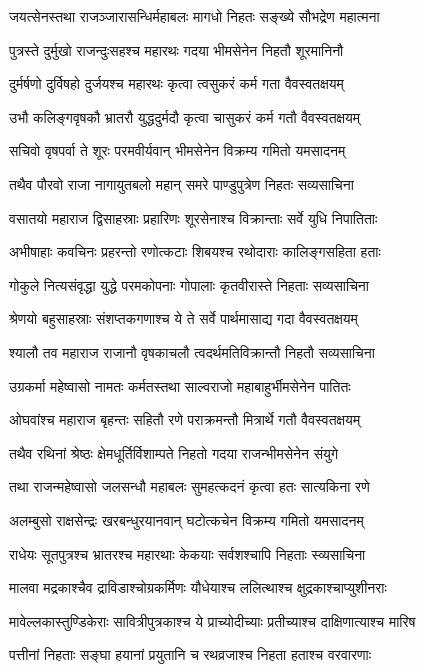 \twolineshloka
{जयत्सेनस्तथा राजञ्जारासन्धिर्महाबलः}
{मागधो निहतः सङ्ख्ये सौभद्रेण महात्मना}


\twolineshloka
{पुत्रस्ते दुर्मुखो राजन्दुःसहश्च महारथः}
{गदया भीमसेनेन निहतौ शूरमानिनौ}


\twolineshloka
{दुर्मर्षणो दुर्विषहो दुर्जयश्च महारथः}
{कृत्वा त्वसुकरं कर्म गता वैवस्वतक्षयम्}


\twolineshloka
{उभौ कलिङ्गवृषकौ भ्रातरौ युद्धदुर्मदौ}
{कृत्वा चासुकरं कर्म गतौ वैवस्वतक्षयम्}


\twolineshloka
{सचिवो वृषपर्वा ते शूरः परमवीर्यवान्}
{भीमसेनेन विक्रम्य गमितो यमसादनम्}


\twolineshloka
{तथैव पौरवो राजा नागायुतबलो महान्}
{समरे पाण्डुपुत्रेण निहतः सव्यसाचिना}


\twolineshloka
{वसातयो महाराज द्विसाहस्राः प्रहारिणः}
{शूरसेनाश्च विक्रान्ताः सर्वे युधि निपातिताः}


\twolineshloka
{अभीषाहाः कवचिनः प्रहरन्तो रणोत्कटाः}
{शिबयश्च रथोदाराः कालिङ्गसहिता हताः}


\twolineshloka
{गोकुले नित्यसंवृद्धा युद्धे परमकोपनाः}
{गोपालाः कृतवीरास्ते निहताः सव्यसाचिना}


\twolineshloka
{श्रेणयो बहुसाहस्राः संशप्तकगणाश्च ये}
{ते सर्वे पार्थमासाद्य गदा वैवस्वतक्षयम्}


\twolineshloka
{श्यालौ तव महाराज राजानौ वृषकाचलौ}
{त्वदर्थमतिविक्रान्तौ निहतौ सव्यसाचिना}


\twolineshloka
{उग्रकर्मा महेष्वासो नामतः कर्मतस्तथा}
{साल्वराजो महाबाहुर्भीमसेनेन पातितः}


\twolineshloka
{ओघवांश्च महाराज बृहन्तः सहितौ रणे}
{पराक्रमन्तौ मित्रार्थे गतौ वैवस्वतक्षयम्}


\twolineshloka
{तथैव रथिनां श्रेष्ठः क्षेमधूर्तिर्विशाम्पते}
{निहतो गदया राजन्भीमसेनेन संयुगे}


\twolineshloka
{तथा राजन्महेष्वासो जलसन्धौ महाबलः}
{सुमहत्कदनं कृत्वा हतः सात्यकिना रणे}


\twolineshloka
{अलम्बुसो राक्षसेन्द्रः खरबन्धुरयानवान्}
{घटोत्कचेन विक्रम्य गमितो यमसादनम्}


\twolineshloka
{राधेयः सूतपुत्रश्च भ्रातरश्च महारथाः}
{केकयाः सर्वशश्चापि निहताः स्व्यसाचिना}


\twolineshloka
{मालवा मद्रकाश्चैव द्राविडाश्चोग्रकर्मिणः}
{यौधेयाश्च ललित्थाश्च क्षुद्रकाश्चाप्युशीनराः}


\twolineshloka
{मावेल्लकास्तुण्डिकेराः सावित्रीपुत्रकाश्च ये}
{प्राच्योदीच्याः प्रतीच्याश्च दाक्षिणात्याश्च मारिष}


\twolineshloka
{पत्तीनां निहताः सङ्घा हयानां प्रयुतानि च}
{रथव्रजाश्च निहता हताश्च वरवारणाः}


